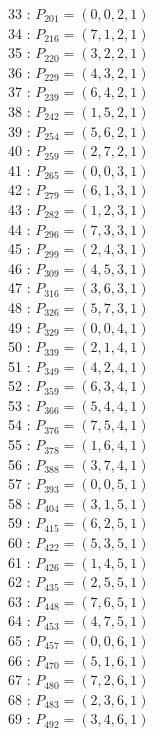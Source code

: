\documentclass{article}
\begin{document}
{\begin{multicols}{3}
33 : $P_{201}=( 0, 0, 2, 1 )$\\
34 : $P_{216}=( 7, 1, 2, 1 )$\\
35 : $P_{220}=( 3, 2, 2, 1 )$\\
36 : $P_{229}=( 4, 3, 2, 1 )$\\
37 : $P_{239}=( 6, 4, 2, 1 )$\\
38 : $P_{242}=( 1, 5, 2, 1 )$\\
39 : $P_{254}=( 5, 6, 2, 1 )$\\
40 : $P_{259}=( 2, 7, 2, 1 )$\\
41 : $P_{265}=( 0, 0, 3, 1 )$\\
42 : $P_{279}=( 6, 1, 3, 1 )$\\
43 : $P_{282}=( 1, 2, 3, 1 )$\\
44 : $P_{296}=( 7, 3, 3, 1 )$\\
45 : $P_{299}=( 2, 4, 3, 1 )$\\
46 : $P_{309}=( 4, 5, 3, 1 )$\\
47 : $P_{316}=( 3, 6, 3, 1 )$\\
48 : $P_{326}=( 5, 7, 3, 1 )$\\
49 : $P_{329}=( 0, 0, 4, 1 )$\\
50 : $P_{339}=( 2, 1, 4, 1 )$\\
51 : $P_{349}=( 4, 2, 4, 1 )$\\
52 : $P_{359}=( 6, 3, 4, 1 )$\\
53 : $P_{366}=( 5, 4, 4, 1 )$\\
54 : $P_{376}=( 7, 5, 4, 1 )$\\
55 : $P_{378}=( 1, 6, 4, 1 )$\\
56 : $P_{388}=( 3, 7, 4, 1 )$\\
57 : $P_{393}=( 0, 0, 5, 1 )$\\
58 : $P_{404}=( 3, 1, 5, 1 )$\\
59 : $P_{415}=( 6, 2, 5, 1 )$\\
60 : $P_{422}=( 5, 3, 5, 1 )$\\
61 : $P_{426}=( 1, 4, 5, 1 )$\\
62 : $P_{435}=( 2, 5, 5, 1 )$\\
63 : $P_{448}=( 7, 6, 5, 1 )$\\
64 : $P_{453}=( 4, 7, 5, 1 )$\\
65 : $P_{457}=( 0, 0, 6, 1 )$\\
66 : $P_{470}=( 5, 1, 6, 1 )$\\
67 : $P_{480}=( 7, 2, 6, 1 )$\\
68 : $P_{483}=( 2, 3, 6, 1 )$\\
69 : $P_{492}=( 3, 4, 6, 1 )$\\

\end{multicols}}
\end{document}
